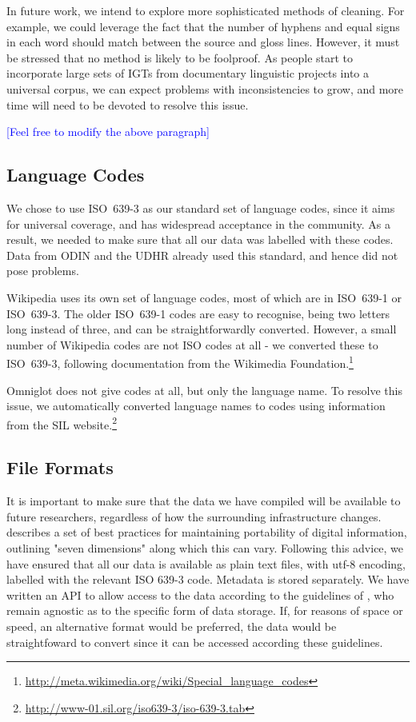 In future work, we intend to explore more sophisticated methods of cleaning.  For example, we could leverage the fact that the number of hyphens and equal signs in each word should match between the source and gloss lines.  However, it must be stressed that no method is likely to be foolproof.  As people start to incorporate large sets of IGTs from documentary linguistic projects into a universal corpus, we can expect problems with inconsistencies to grow, and more time will need to be devoted to resolve this issue.

\textcolor{blue}{[Feel free to modify the above paragraph]}



\subsection{Language Codes}

We chose to use ISO~639-3 as our standard set of language codes, since it aims for universal coverage, and has widespread acceptance in the community.  As a result, we needed to make sure that all our data was labelled with these codes.  Data from ODIN and the UDHR already used this standard, and hence did not pose problems.

Wikipedia uses its own set of language codes, most of which are in ISO~639-1 or ISO~639-3.  The older ISO~639-1 codes are easy to recognise, being two letters long instead of three, and can be straightforwardly converted.  However, a small number of Wikipedia codes are not ISO codes at all - we converted these to ISO~639-3, following documentation from the Wikimedia Foundation.\footnote{\url{http://meta.wikimedia.org/wiki/Special\_language\_codes}}

Omniglot does not give codes at all, but only the language name. To resolve this issue, we automatically converted language names to codes using information from the SIL website.\footnote{\url{http://www-01.sil.org/iso639-3/iso-639-3.tab}}



\subsection{File Formats}

It is important to make sure that the data we have compiled will be available to future researchers, regardless of how the surrounding infrastructure changes.  describes a set of best practices for maintaining portability of digital information, outlining "seven dimensions" along which this can vary. Following this advice, we have ensured that all our data is available as plain text files, with utf-8 encoding, labelled with the relevant ISO 639-3 code. Metadata is stored separately. We have written an API to allow access to the data according to the guidelines of , who remain agnostic as to the specific form of data storage. If, for reasons of space or speed, an alternative format would be preferred, the data would be straightfoward to convert since it can be accessed according these guidelines.
